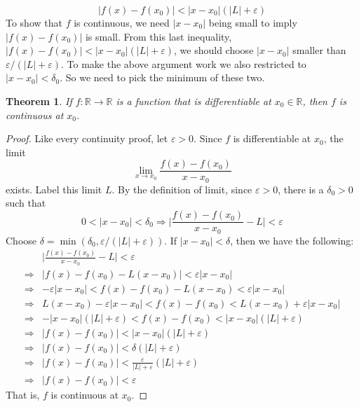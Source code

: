 \documentclass{article}
\theoremstyle{normal}
\theoremstyle{plain}
\newtheorem{theorem}{Theorem}
\begin{document}
    \begin{equation}
        |f(x)-f(x_{0})|<|x-x_{0}|(|L|+\varepsilon)
    \end{equation}
    To show that $f$ is continuous, we need $|x-x_{0}|$ being small to
    imply $|f(x)-f(x_{0})|$ is small. From this last inequality,
    $|f(x)-f(x_{0})|<|x-x_{0}|(|L|+\varepsilon)$, we should choose
    $|x-x_{0}|$ smaller than $\varepsilon/(|L|+\varepsilon)$. To make the
    above argument work we also restricted to $|x-x_{0}|<\delta_{0}$. So we
    need to pick the minimum of these two.
    \begin{theorem}
        If $f:\mathbb{R}\rightarrow\mathbb{R}$ is a function that is
        differentiable at $x_{0}\in\mathbb{R}$, then $f$ is continuous
        at $x_{0}$.
    \end{theorem}
    \begin{proof}
        Like every continuity proof, let $\varepsilon>0$. Since $f$ is
        differentiable at $x_{0}$, the limit
        \begin{equation}
            \lim_{x\rightarrow{x}_{0}}\frac{f(x)-f(x_{0})}{x-x_{0}}
        \end{equation}
        exists. Label this limit $L$. By the definition of limit, since
        $\varepsilon>0$, there is a $\delta_{0}>0$ such that
        \begin{equation}
            0<|x-x_{0}|<\delta_{0}\Rightarrow
            \Big|\frac{f(x)-f(x_{0})}{x-x_{0}}-L\Big|<\varepsilon
        \end{equation}
        Choose $\delta=\min(\delta_{0},\varepsilon/(|L|+\varepsilon))$.
        If $|x-x_{0}|<\delta$, then we have the following:
        \begin{align}
            &\Big|\frac{f(x)-f(x_{0})}{x-x_{0}}-L\Big|<\varepsilon\\
            \Rightarrow&|f(x)-f(x_{0})-L(x-x_{0})|<\varepsilon|x-x_{0}|\\
            \Rightarrow&-\varepsilon|x-x_{0}|<
                f(x)-f(x_{0})-L(x-x_{0})<\varepsilon|x-x_{0}|\\
            \Rightarrow&
                L(x-x_{0})-\varepsilon|x-x_{0}|<
                    f(x)-f(x_{0})<L(x-x_{0})+\varepsilon|x-x_{0}|\\
            \Rightarrow&
                -|x-x_{0}|(|L|+\varepsilon)<f(x)-f(x_{0})
                    <|x-x_{0}|(|L|+\varepsilon)\\
            \Rightarrow&
                |f(x)-f(x_{0})|<|x-x_{0}|(|L|+\varepsilon)\\
            \Rightarrow&
                |f(x)-f(x_{0})|<\delta(|L|+\varepsilon)\\
            \Rightarrow&
                |f(x)-f(x_{0})|<\frac{\varepsilon}{|L|+\varepsilon}
                    (|L|+\varepsilon)\\
            \Rightarrow&|f(x)-f(x_{0})|<\varepsilon
        \end{align}
        That is, $f$ is continuous at $x_{0}$.
    \end{proof}
\end{document}
